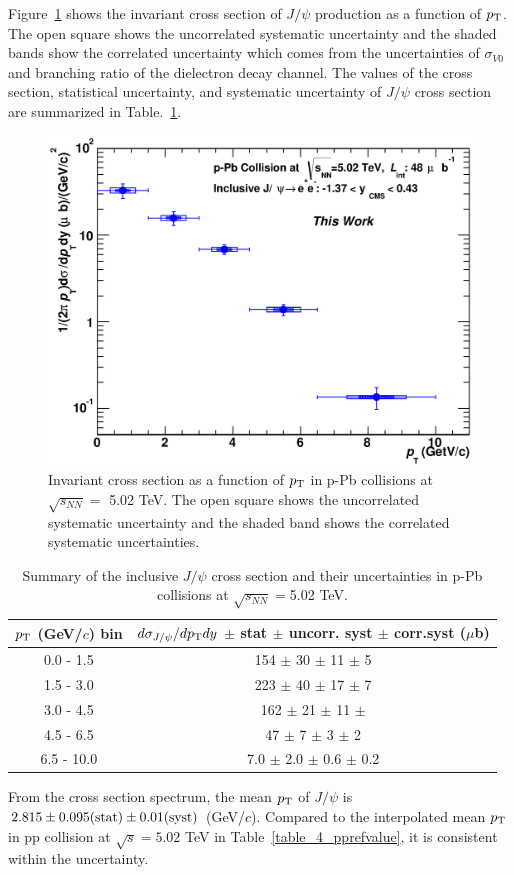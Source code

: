 Figure~\ref{fig_5_xsectionpt} shows the invariant cross section of $J/\psi$ production as a function of $p_{\rm{T}}$. 
The open square shows the uncorrelated systematic uncertainty and the shaded bands show the correlated uncertainty which comes from the uncertainties of $\sigma_{V0}$ and branching ratio of the dielectron decay channel. 
The values of the cross section, statistical uncertainty, and systematic uncertainty of $J/\psi$ cross section are summarized in Table.~\ref{table_5_xsection}.
\begin{figure}[!h]
  \centering
  \includegraphics[width=12cm]{chap5/figure/CrossSection/JpsiInvCrossSection_MB_Pt_bin2_tw.eps}
  \caption{
    Invariant cross section as a function of $p_{\rm{T}}$ in p-Pb collisions at $\sqrt{s_{NN}}=$ 5.02 TeV.
    The open square shows the uncorrelated systematic uncertainty and the shaded band shows the correlated systematic uncertainties. 
  }
  \label{fig_5_xsectionpt}
\end{figure}
\begin{table}[!h]
  \centering
  \begin{tabular}{c|c} \hline
    $p_{\rm{T}}$ (GeV/$c$)  bin & $d\sigma_{J/\psi}/dp_{\rm{T}}dy$ $\pm$ stat $\pm$ uncorr. syst $\pm$  corr.syst ($\mu$b)\\ \hline
    0.0 - 1.5                     & 154 $\pm$ 30 $\pm$ 11 $\pm$ 5  \\
    1.5 - 3.0                   & 223 $\pm$ 40 $\pm$ 17 $\pm$ 7  \\
    3.0 - 4.5                   & 162 $\pm$ 21 $\pm$ 11 $\pm$    \\
    4.5 - 6.5                   & 47 $\pm$ 7 $\pm$ 3 $\pm$ 2    \\
    6.5 - 10.0                  & 7.0 $\pm$ 2.0 $\pm$  0.6 $\pm$ 0.2                        \\ \hline
  \end{tabular}
  \caption{Summary of the inclusive $J/\psi$ cross section and their uncertainties in p-Pb collisions at $\sqrt{s_{NN}}=$5.02 TeV.}
  \label{table_5_xsection}
\end{table}
From the cross section spectrum, the mean $p_{\rm{T}}$ of $J/\psi$ is $2.815\pm0.095(\rm{stat})\pm0.01(\rm{syst})$ (GeV/$c$). 
Compared to the interpolated mean $p_{\rm{T}}$ in pp collision at $\sqrt{s}=5.02$ TeV in Table~\ref{table_4_pprefvalue}, it is consistent within the uncertainty. 

